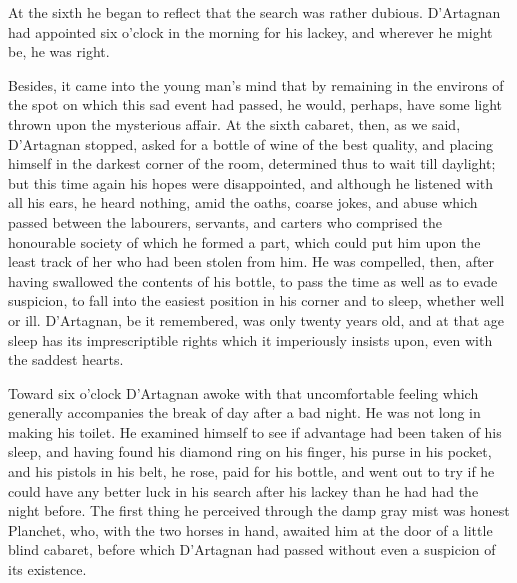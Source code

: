 At the sixth he began to reflect that the search was rather dubious. D'Artagnan had appointed six o'clock in the morning for his lackey, and wherever he might be, he was right. 

Besides, it came into the young man's mind that by remaining in the environs of the spot on which this sad event had passed, he would, perhaps, have some light thrown upon the mysterious affair. At the sixth cabaret, then, as we said, D'Artagnan stopped, asked for a bottle of wine of the best quality, and placing himself in the darkest corner of the room, determined thus to wait till daylight; but this time again his hopes were disappointed, and although he listened with all his ears, he heard nothing, amid the oaths, coarse jokes, and abuse which passed between the labourers, servants, and carters who comprised the honourable society of which he formed a part, which could put him upon the least track of her who had been stolen from him. He was compelled, then, after having swallowed the contents of his bottle, to pass the time as well as to evade suspicion, to fall into the easiest position in his corner and to sleep, whether well or ill. D'Artagnan, be it remembered, was only twenty years old, and at that age sleep has its imprescriptible rights which it imperiously insists upon, even with the saddest hearts. 

Toward six o'clock D'Artagnan awoke with that uncomfortable feeling which generally accompanies the break of day after a bad night. He was not long in making his toilet. He examined himself to see if advantage had been taken of his sleep, and having found his diamond ring on his finger, his purse in his pocket, and his pistols in his belt, he rose, paid for his bottle, and went out to try if he could have any better luck in his search after his lackey than he had had the night before. The first thing he perceived through the damp gray mist was honest Planchet, who, with the two horses in hand, awaited him at the door of a little blind cabaret, before which D'Artagnan had passed without even a suspicion of its existence.